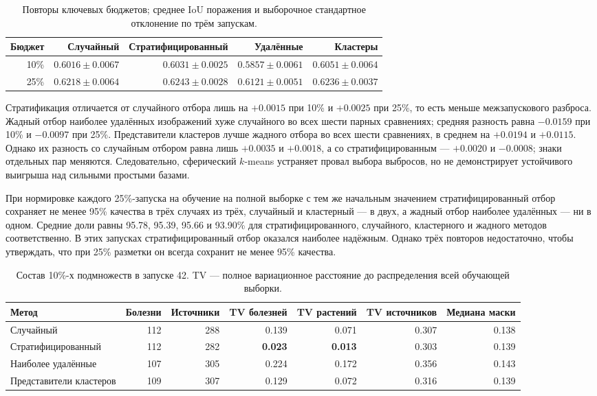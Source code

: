 \documentclass[a4paper,12pt]{extarticle}
\begin{document}
\begin{table}[ht]
  \caption{Повторы ключевых бюджетов; среднее IoU поражения и выборочное
  стандартное отклонение по трём запускам.}
  \label{tab:label-efficiency-repeats}
  \centering
  \footnotesize
  \begin{tabular}{rrrrr}
    \toprule
    Бюджет & Случайный & Стратифицированный & Удалённые & Кластеры \\
    \midrule
    10\% & $0.6016\pm0.0067$ & $0.6031\pm0.0025$ & $0.5857\pm0.0061$ & $0.6051\pm0.0064$ \\
    25\% & $0.6218\pm0.0064$ & $0.6243\pm0.0028$ & $0.6121\pm0.0051$ & $0.6236\pm0.0037$ \\
    \bottomrule
  \end{tabular}
\end{table}

Стратификация отличается от случайного отбора лишь на $+0.0015$ при 10\% и
$+0.0025$ при 25\%, то есть меньше межзапускового разброса. Жадный отбор
наиболее удалённых изображений хуже случайного во всех шести парных сравнениях;
средняя разность равна $-0.0159$ при 10\% и $-0.0097$ при 25\%.
Представители кластеров лучше жадного отбора во всех шести сравнениях, в
среднем на $+0.0194$ и $+0.0115$. Однако их разность со случайным отбором
равна лишь $+0.0035$ и $+0.0018$, а со стратифицированным --- $+0.0020$ и
$-0.0008$; знаки отдельных пар меняются. Следовательно, сферический $k$-means
устраняет провал выбора выбросов, но не демонстрирует устойчивого выигрыша над
сильными простыми базами.

При нормировке каждого 25\%-запуска на обучение на полной выборке с тем же
начальным значением стратифицированный отбор сохраняет не менее 95\% качества
в трёх случаях из трёх, случайный и кластерный --- в двух, а жадный отбор
наиболее удалённых --- ни в одном. Средние доли равны 95.78, 95.39, 95.66 и
93.90\% для стратифицированного, случайного, кластерного и жадного методов
соответственно. В этих запусках стратифицированный отбор оказался наиболее
надёжным. Однако трёх повторов недостаточно, чтобы утверждать, что при 25\%
разметки он всегда сохранит не менее 95\% качества.

\begin{table}[ht]
  \caption{Состав 10\%-х подмножеств в запуске 42. TV --- полное вариационное
  расстояние до распределения всей обучающей выборки.}
  \label{tab:subset-composition}
  \centering
  \scriptsize
  \begin{tabular}{lrrrrrr}
    \toprule
    Метод & Болезни & Источники & TV болезней & TV растений & TV источников & Медиана маски \\
    \midrule
    Случайный & 112 & 288 & 0.139 & 0.071 & 0.307 & 0.138 \\
    Стратифицированный & 112 & 282 & \textbf{0.023} & \textbf{0.013} & 0.303 & 0.139 \\
    Наиболее удалённые & 107 & 305 & 0.224 & 0.172 & 0.356 & 0.143 \\
    Представители кластеров & 109 & 307 & 0.129 & 0.072 & 0.316 & 0.139 \\
    \bottomrule
  \end{tabular}
\end{table}
\end{document}
